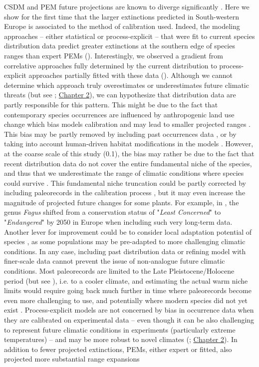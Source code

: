 \documentclass[letterpaper,8pt]{extarticle}  %
\begin{document}
\begin{doublespacing}
\begin{linenumbers}
CSDM and PEM future projections are known to diverge significantly \citep{Morin2009, Keenan2011a, Cheaib2012, Takolander2019}.
Here we show for the first time that the larger extinctions predicted in South-western Europe is associated to the method of calibration used. Indeed, the modeling approaches -- either statistical or process-explicit -- that were fit to current species distribution data predict greater extinctions at the southern edge of species ranges than expert PEMs (). Interestingly, we observed a gradient from correlative approaches fully determined by the current distribution to process-explicit approaches partially fitted with these data (). Although we cannot determine which approach truly overestimates or underestimates future climatic threats (but see \citealp{VanderMeersch2024}; \hyperref[chapter2]{Chapter 2}), we can hypothesize that distribution data are partly responsible for this pattern. This might be due to the fact that contemporary species occurrences are influenced by anthropogenic land use change which bias models calibration and may lead to smaller projected ranges \citep{Ay2017, Faurby2018}. This bias may be partly removed by including past occurrences data \citep{Faurby2018}, or by taking into account human-driven habitat modifications in the models \citep{Ay2017}. However, at the coarse scale of this study (0.1\degree), the bias may rather be due to the fact that recent distribution data do not cover the entire fundamental niche of the species, and thus that we underestimate the range of climatic conditions where species could survive \citep{NoguesBravo2016, Chevalier2024}. This fundamental niche truncation could be partly corrected by including paleorecords in the calibration process \citep{Maiorano2013}, but it may even increase the magnitude of projected future changes for some plants. For example, in \citet{NoguesBravo2016}, the genus \emph{Fagus} shifted from a conservation status of "\emph{Least Concerned}" to "\emph{Endangered}" by 2050 in Europe when including such very long-term data. Another lever for improvement could be to consider local adaptation potential of species \citep{BenitoGarzon2011}, as some populations may be pre-adapted to more challenging climatic conditions. In any case, including past distribution data or refining model with finer-scale data cannot prevent the issue of non-analogue future climatic conditions. Most paleorecords are limited to the Late Pleistocene/Holocene period (but see \citealp{Chiarenza2023}), i.e. to a cooler climate, and estimating the actual warm niche limits would require going back much further in time where paleorecords become even more challenging to use, and potentially where modern species did not yet exist \citep{Burke2018, Chevalier2024}. Process-explicit models are not concerned by bias in occurrence data when they are calibrated on experimental data -- even though it can be also challenging to represent future climatic conditions in experiments (particularly extreme temperatures) -- and may be more robust to novel climates (\citealp{VanderMeersch2024}; \hyperref[chapter2]{Chapter 2}). In addition to fewer projected extinctions, PEMs, either expert or fitted, also projected more substantial range expansions 
\end{linenumbers}
\end{doublespacing}
\end{document}

